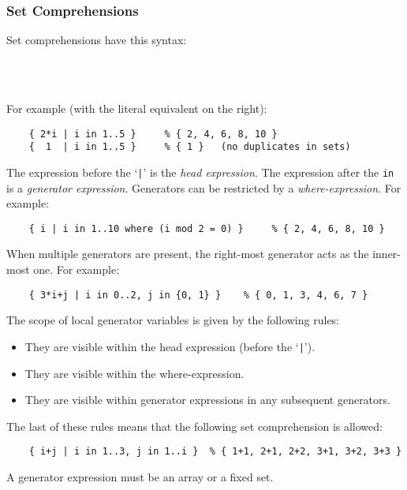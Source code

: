 \documentclass[10pt]{scrartcl}
\begin{document}
\subsubsection{Set Comprehensions}
        \label{Set Comprehensions}
Set comprehensions have this syntax:
\begin{productions}
    \RuleSetComp \\
    \RuleCompTail \\
    \RuleGenerator
\end{productions}
For example (with the literal equivalent on the right):
\begin{verbatim}
    { 2*i | i in 1..5 }     % { 2, 4, 6, 8, 10 }
    {  1  | i in 1..5 }     % { 1 }   (no duplicates in sets)
\end{verbatim}
The expression before the `\texttt{|}' is the \emph{head expression}.  The
expression after the \texttt{in} is a \emph{generator expression}.
%
Generators can be restricted by a \emph{where-expression}.  For example:
\begin{verbatim}
    { i | i in 1..10 where (i mod 2 = 0) }     % { 2, 4, 6, 8, 10 }
\end{verbatim}
%
When multiple generators are present, the right-most generator acts as the
inner-most one.  For example:
\begin{verbatim}
    { 3*i+j | i in 0..2, j in {0, 1} }    % { 0, 1, 3, 4, 6, 7 }
\end{verbatim}
The scope of local generator variables is given by the following rules:
\begin{itemize}
\item They are visible within the head expression (before the `\texttt{|}').
\item They are visible within the where-expression.
\item They are visible within generator expressions in any subsequent
      generators.
\end{itemize}
The last of these rules means that the following set comprehension is allowed:
\begin{verbatim}
    { i+j | i in 1..3, j in 1..i }  % { 1+1, 2+1, 2+2, 3+1, 3+2, 3+3 }
\end{verbatim}

A generator expression must be an array or a fixed set.

\end{document}
